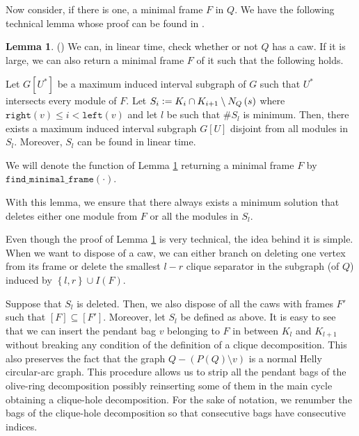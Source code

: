 \documentclass{article}
\theoremstyle{definition}
\newtheorem{lemma}[thm]{Lemma}
\newcommand{\defeq}{\vcentcolon=}
\begin{document}
    Now consider, if there is one,
    a minimal frame $F$ in $Q$.
    We have the following technical lemma
    whose proof can be found in \cite{main}.

    \begin{lemma} (\cite{main}) \label{frame lemma}
        We can, in linear time,
        check whether or not
        $Q$ has a caw.
        If it is large,
        we can also return
        a minimal frame $F$ of it
        such that the following
        holds.

        Let $G\left[U^{*}\right]$ be
        a maximum induced interval
        subgraph of $G$
        such that $U^{*}$ 
        intersects every module
        of $F$.
        Let $S_{i} \defeq K_{i} \cap K_{i+1} \setminus N_{Q}\left(s\right)$ 
        where $\texttt{right}\left(v\right) \leq i < \texttt{left}\left(v\right)$
        and let $l$ be such
        that $\#S_{l}$ is minimum.
        Then, there exists a maximum
        induced interval subgraph
        $G\left[U\right]$ 
        disjoint from all modules in $S_{l}$.
        Moreover, $S_{l}$ can be
        found in linear time.
    \end{lemma}
    
    We will denote the
    function of Lemma \ref{frame lemma}
    returning a minimal frame
    $F$ by $\texttt{find\_minimal\_frame}\left(\cdot\right)$.

    With this lemma, we ensure that
    there always exists a minimum
    solution that deletes either 
    one module from $F$ or all
    the modules in $S_{l}$.
    
    Even though the proof
    of Lemma \ref{frame lemma}
    is very technical, the
    idea behind it is simple.
    When we want to dispose
    of a caw, we can either
    branch on deleting one 
    vertex from its frame
    or delete the smallest
    $l-r$ clique separator
    in the subgraph (of $Q$) induced by
    $\left\{l, r\right\} \cup I\left(F\right)$.

    Suppose that $S_{l}$ is
    deleted.
    Then, we
    also dispose of all
    the caws with frames $F'$ 
    such that $\left[F\right] \subseteq \left[F'\right]$.
    Moreover, let $S_{l}$ 
    be defined as above. It
    is easy to see that we can
    insert the pendant bag $v$
    belonging to $F$
    in between $K_{l}$ and
    $K_{l+1}$ without breaking
    any condition of the definition 
    of a clique decomposition.
    This also preserves the fact
    that the graph $Q - \left(P\left(Q\right) \setminus v\right)$
    is a normal Helly circular-arc graph.
    This procedure
    allows us to strip
    all the pendant bags
    of the olive-ring
    decomposition possibly 
    reinserting some of 
    them in the main cycle
    obtaining a clique-hole decomposition.
    For the sake of notation,
    we renumber the
    bags of the clique-hole decomposition
    so that consecutive
    bags have consecutive
    indices.
\end{document}
